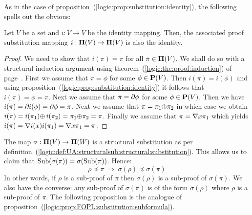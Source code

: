 As in the case of
proposition~(\ref{logic:prop:substitution:identity}), the following
spells out the obvious:

\begin{prop}\label{logic:prop:FUAP:substitution:identity}
Let $V$ be a set and $i:V\to V$ be the identity mapping. Then, the
associated proof substitution mapping $i:\mbox{${\bf\Pi}(V)$}\to\mbox{${\bf\Pi}(V)$}$ is also the
identity.
\end{prop}
\begin{proof}
We need to show that $i(\pi)=\pi$ for all $\pi\in\mbox{${\bf\Pi}(V)$}$. We shall do
so with a structural induction argument using
theorem~(\ref{logic:the:proof:induction}) of
page~\pageref{logic:the:proof:induction}. First we assume that
$\pi=\phi$ for some $\phi\in\mbox{${\bf P}(V)$}$. Then $i(\pi)=i(\phi)$ and using
proposition~(\ref{logic:prop:substitution:identity}) it follows that
$i(\pi)=\phi=\pi$. Next we assume that $\pi=\mbox{$\partial$}\phi$ for some
$\phi\in\mbox{${\bf P}(V)$}$. Then we have $i(\pi)=\mbox{$\partial$} i(\phi)=\mbox{$\partial$}\phi=\pi$. Next
we assume that $\pi=\pi_{1}\mbox{$\oplus$}\pi_{2}$ in which case we obtain
$i(\pi)=i(\pi_{1})\mbox{$\oplus$}\, i(\pi_{2})=\pi_{1}\mbox{$\oplus$}\pi_{2}=\pi$. Finally
we assume that $\pi=\mbox{$\nabla$} x\pi_{1}$ which yields $i(\pi)=\mbox{$\nabla$}
i(x)i(\pi_{1})=\mbox{$\nabla$} x\pi_{1}=\pi$.
\end{proof}

The map $\sigma:\mbox{${\bf\Pi}(V)$}\to{\bf\Pi}(W)$ is a structural substitution as
per
definition~(\ref{logic:def:UA:structuralsub:structural:substitution}).
This allows us to claim that
$\mbox{\rm Sub}(\sigma(\pi))=\sigma(\mbox{\rm Sub}(\pi))$. Hence:
    \[
    \rho\preceq\pi\ \Rightarrow\ \sigma(\rho)\preceq\sigma(\pi)
    \]
In other words, if $\rho$ is a sub-proof of $\pi$ then
$\sigma(\rho)$ is a sub-proof of $\sigma(\pi)$. We also have the
converse: any sub-proof of $\sigma(\pi)$ is of the form
$\sigma(\rho)$ where $\rho$ is a sub-proof of $\pi$. The following
proposition is the analogue of
proposition~(\ref{logic:prop:FOPL:substitution:subformula}).



